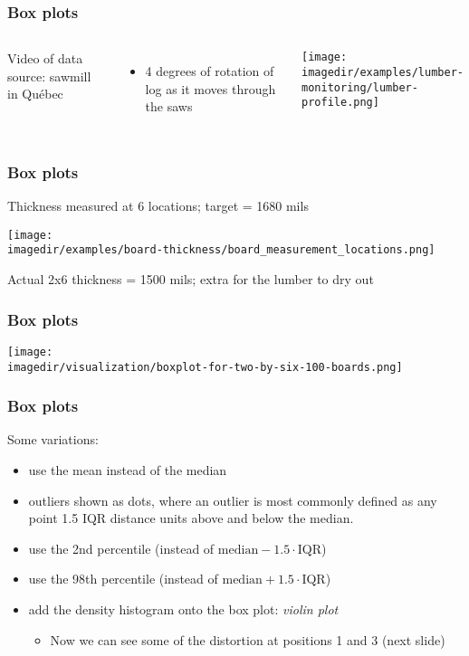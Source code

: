 \begin{frame}\frametitle{Box plots}
	\begin{columns}[c]
			Video of data source: sawmill in Québec
			\begin{itemize}
				\item	4 degrees of rotation of log as it moves through the saws
			\end{itemize}
			\vspace{-24pt}
			\begin{center}
				\texttt{[image: \\imagedir/examples/lumber-monitoring/lumber-profile.png]}
			\end{center}
	\end{columns}
\end{frame}

\begin{frame}\frametitle{Box plots}
	
	Thickness measured at 6 locations; target = 1680 mils
	\begin{center}
		\texttt{[image: \\imagedir/examples/board-thickness/board\_measurement\_locations.png]}
	\end{center}
	\vfill
	Actual 2x6 thickness = 1500 mils; extra for the lumber to dry out
\end{frame}

\begin{frame}\frametitle{Box plots}
	\begin{center}
		\texttt{[image: \\imagedir/visualization/boxplot-for-two-by-six-100-boards.png]}
	\end{center}
\end{frame}

\begin{frame}\frametitle{Box plots}
	
	Some variations:
	\begin{itemize}
		\item	use the mean instead of the median 
		\item	outliers shown as dots, where an outlier is most commonly defined as any point 1.5 IQR distance units above and below the median. 
		\item	use the 2nd percentile (instead of $\text{median} - 1.5\cdot\text{IQR}$) 
		\item	use the 98th percentile (instead of $\text{median} + 1.5\cdot\text{IQR}$) 
		\item	add the density histogram onto the box plot: \emph{violin plot} 
		\begin{itemize}
			\item	Now we can see some of the distortion at positions 1 and 3 (next slide)
		\end{itemize}
	\end{itemize}
\end{frame}

